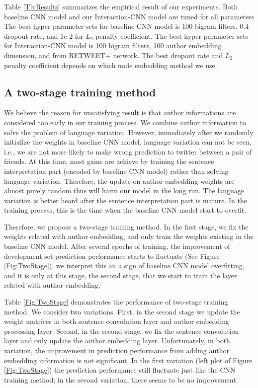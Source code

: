 Table \ref{Tb:Results} summarizes the empirical result of our experiments. Both baseline CNN model and our Interaction-CNN model are tuned for all parameters The best hyper parameter sets for baseline CNN model is 100 bigram filters, 0.4 dropout rate, and 1e-2 for $L_2$ penalty coefficient. The best hyper parameter sets for Interaction-CNN model is 100 bigram filters, 100 author embedding dimension, and from RETWEET+ network. The best dropout rate and $L_2$ penalty coefficient depends on which node embedding method we use.





\subsection{A two-stage training method}
We believe the reason for unsatisfying result is that author informations are considered too early 
in our training process. We combine author information to solve the problem of language variation. 
However, immediately after we randomly initialize the weights in baseline CNN model, language variation 
can not be seen, i.e., we are not more likely to make wrong prediction to twitter between a pair of friends. 
At this time, most gains are achieve by training the sentence interpretation part (encoded by baseline CNN model)
rather than solving language variation. Therefore, the update on author embedding weights are almost purely 
random thus will harm our model in the long run. The language variation is better heard after the sentence 
interpretation part is mature. In the training process, this is the time when the baseline CNN model start to overfit. 

Therefore, we propose a two-stage training method.
In the first stage, we fix the weights related with author embedding, and only train the weights existing in the
baseline CNN model. After several epochs of training, the improvement of development set prediction 
performance starts to fluctuate  (See Figure \ref{Fig:TwoStage}), we interpret this an a sign of baseline 
CNN model overfitting, and it is only at this stage, the second stage, that we start to train the layer related with
author embedding. 

Table \ref{Fig:TwoStage} demonstrates the performance of two-stage training method. We consider two variations. 
First, in the second stage we update the weight matrices in both sentence convolution layer and author embedding
processing layer. Second, in the second stage, we fix the sentence convolution layer and only update the author embedding
layer. Unfortunately, in both variation, the improvement in prediction performance from adding author embedding
information is not significant. In the first variation (left plot of Figure \ref{Fig:TwoStage}) the prediction performance 
still fluctuate just like the CNN training method; in the second variation, there seems to be no improvement. 


